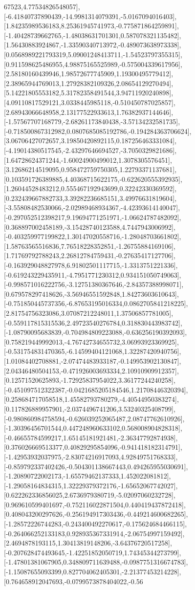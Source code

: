\documentclass{article}
\begin{document}
67523,4.77534826548057],[-6.41840737890439,-14.9981314079391,-5.0167094016403],[1.84235989536183,8.25361945741973,-0.775871864259891],[-1.40428739662765,-1.48038631701301,0.587078321135482],[1.56430883924867,-1.33590340713972,-0.489073638973338],[0.0568989221793319,5.09001248413711,-1.54523797355315],[0.911598625486955,4.98875165525989,-0.575004339617956],[2.58180160439946,1.98572677745909,1.19300495779412],[2.38965944769013,1.27928382109326,2.08654129270494],[5.14221805553182,5.31782358491544,3.94711920240898],[4.09110817529121,3.0338445985118,-0.510450787025857],[2.68943066648958,2.13177522933613,1.76382937144646],[-1.57567707168779,-2.68261173840438,-3.57134232581735],[-0.718500867312982,0.0807685085192786,-0.194284363706624],[3.06706427072657,3.19850420892115,0.187256463331084],[-4.19014380517545,-2.43297646694527,-3.7050329821686],[1.64728624371244,-1.60024900499012,1.3078305576451],[3.12686214519095,0.958472759750305,1.22793371137681],[0.103591726389885,4.40368715622175,-0.622620555392935],[1.26044528483212,0.555467192943699,0.32242330369592],[0.232439667882733,3.39282236685151,3.49976631819604],[-3.55808482530066,-2.02989468934367,-4.42393614140047],[-0.297052512398217,9.19694771251971,-1.06624787482092],[0.368897002458189,-3.15428740123588,4.7447943006992],[-0.403259977199822,1.30147020558716,-1.28048703661802],[1.58763565516836,7.76518228352851,-1.26755884169106],[1.71769792788243,2.26812784759431,-0.27635417127706],[-0.163929048827978,6.91802501117715,-1.3313751221336],[-0.619243229435911,-4.7951771230312,0.934151050749063],[-0.998571016222756,-3.12751380367646,-2.84357388998071],[0.679578297418626,-3.56946551592848,1.84273603610643],[-0.751850445737356,-6.87653195016334,0.0862705841218225],[2.81754756323086,3.07087212248011,1.37506857781005],[-0.559117815315536,2.49723540276784,0.318830443983742],[-1.08790095683839,-0.704984809223088,-0.636256190392093],[0.758219449992013,-4.76742734655732,3.06993923369925],[-0.531754831470365,-6.14599404121068,1.32287420940756],[1.01084402708881,-2.07474483933187,-0.149953902130847],[2.04346480504153,-0.471926003693334,2.10910909912357],[0.12571520625893,-1.72925837954022,3.36177244240258],[-0.451097512322387,-0.0421685205184546,1.21708446320394],[0.258684717058518,1.45582793780279,-4.40544950383274],[0.117826889957901,-2.0374496741206,3.53240325408799],[-0.980860984758594,-0.626039252065487,2.08747762610926],[-1.30396456701544,0.447248960633102,0.568008904828318],[-0.46655784599217,1.65145181921481,-2.36347792874938],[0.376026669513377,0.40829295854096,-0.941418182314791],[-1.42953932037975,-2.83074216917093,4.92849751768333],[-0.859792337402426,-0.504301138667443,0.494265955030691],[-1.20890722002173,-1.65579462137333,1.452022081812],[-1.29058164834315,1.32229379372176,-1.65652067742027],[0.622262336856025,2.6736979380719,-5.02097060232728],[0.969610599401697,-0.752116022871504,0.440419437872418],[0.408043200297626,-0.256194917303436,-0.449214600682265],[-1.28572226744283,-0.243400492270617,-0.175624684466115],[-0.264066252133183,0.928935367331914,-2.06754997159492],[2.4694878193115,1.30413819148206,-3.64376720517258],[-0.207628474493645,-1.42251852050719,1.74345344273799],[-1.47801381067905,0.348809711639488,-0.0987751316674783],[-1.15087655093399,0.827704062405301,-2.21377453214228],[0.764658912047693,-0.0799573878404022,-0.56
\end{document}
